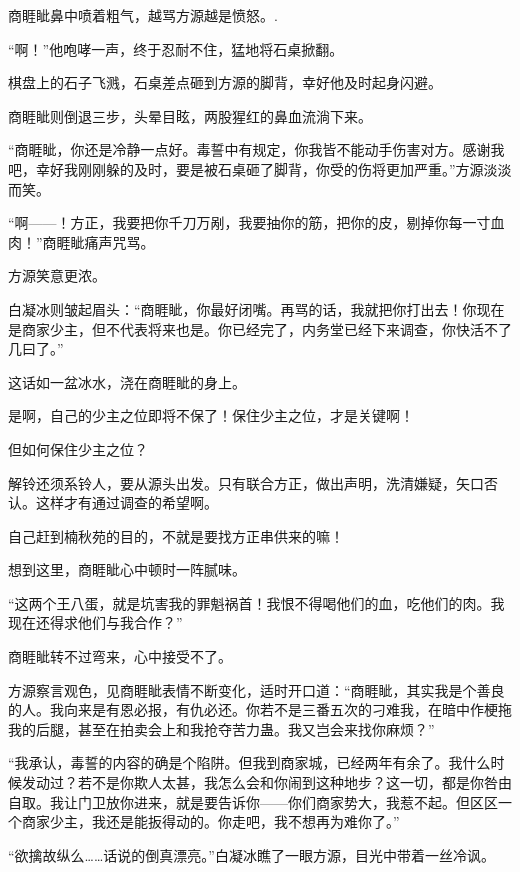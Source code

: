 
\begin{this_body}

商睚眦鼻中喷着粗气，越骂方源越是愤怒。.

“啊！”他咆哮一声，终于忍耐不住，猛地将石桌掀翻。

棋盘上的石子飞溅，石桌差点砸到方源的脚背，幸好他及时起身闪避。

商睚眦则倒退三步，头晕目眩，两股猩红的鼻血流淌下来。

“商睚眦，你还是冷静一点好。毒誓中有规定，你我皆不能动手伤害对方。感谢我吧，幸好我刚刚躲的及时，要是被石桌砸了脚背，你受的伤将更加严重。”方源淡淡而笑。

“啊——！方正，我要把你千刀万剐，我要抽你的筋，把你的皮，剔掉你每一寸血肉！”商睚眦痛声咒骂。

方源笑意更浓。

白凝冰则皱起眉头：“商睚眦，你最好闭嘴。再骂的话，我就把你打出去！你现在是商家少主，但不代表将来也是。你已经完了，内务堂已经下来调查，你快活不了几曰了。”

这话如一盆冰水，浇在商睚眦的身上。

是啊，自己的少主之位即将不保了！保住少主之位，才是关键啊！

但如何保住少主之位？

解铃还须系铃人，要从源头出发。只有联合方正，做出声明，洗清嫌疑，矢口否认。这样才有通过调查的希望啊。

自己赶到楠秋苑的目的，不就是要找方正串供来的嘛！

想到这里，商睚眦心中顿时一阵腻味。

“这两个王八蛋，就是坑害我的罪魁祸首！我恨不得喝他们的血，吃他们的肉。我现在还得求他们与我合作？”

商睚眦转不过弯来，心中接受不了。

方源察言观色，见商睚眦表情不断变化，适时开口道：“商睚眦，其实我是个善良的人。我向来是有恩必报，有仇必还。你若不是三番五次的刁难我，在暗中作梗拖我的后腿，甚至在拍卖会上和我抢夺苦力蛊。我又岂会来找你麻烦？”

“我承认，毒誓的内容的确是个陷阱。但我到商家城，已经两年有余了。我什么时候发动过？若不是你欺人太甚，我怎么会和你闹到这种地步？这一切，都是你咎由自取。我让门卫放你进来，就是要告诉你——你们商家势大，我惹不起。但区区一个商家少主，我还是能扳得动的。你走吧，我不想再为难你了。”

“欲擒故纵么……话说的倒真漂亮。”白凝冰瞧了一眼方源，目光中带着一丝冷讽。


\end{this_body}
